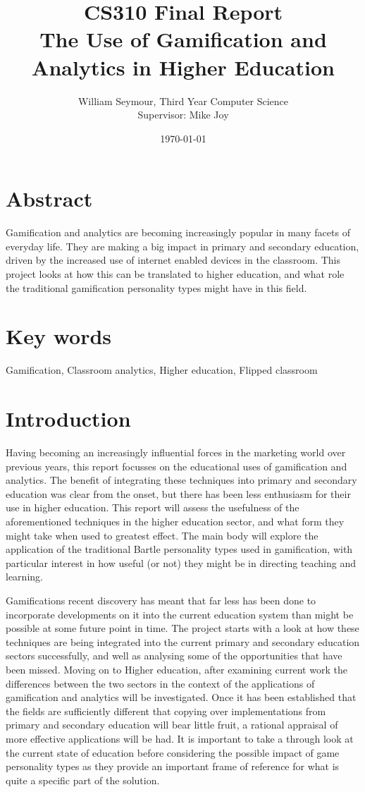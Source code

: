 \documentclass{article}
\title{CS310 Final Report \\ The Use of Gamification and Analytics in Higher Education}
\author{William Seymour, Third Year Computer Science \\ Supervisor: Mike Joy}
\date{\today}
\begin{document}
\maketitle
\clearpage
\tableofcontents
\listoffigures
\listoftables

\section{Abstract}
Gamification and analytics are becoming increasingly popular in many facets of everyday life. They are making a big impact in primary and secondary education, driven by the increased use of internet enabled devices in the classroom. This project looks at how this can be translated to higher education, and what role the traditional gamification personality types might have in this field.

\section{Key words}
Gamification, Classroom analytics, Higher education, Flipped classroom

\section{Introduction}
Having becoming an increasingly influential forces in the marketing world over previous years, this report focusses on the educational uses of gamification and analytics. The benefit of integrating these techniques into primary and secondary education was clear from the onset, but there has been less enthusiasm for their use in higher education. This report will assess the usefulness of the aforementioned techniques in the higher education sector, and what form they might take when used to greatest effect. The main body will explore the application of the traditional Bartle personality types used in gamification, with particular interest in how useful (or not) they might be in directing teaching and learning.

Gamifications recent discovery has meant that far less has been done to incorporate developments on it into the current education system than might be possible at some future point in time. The project starts with a look at how these techniques are being integrated into the current primary and secondary education sectors successfully, and well as analysing some of the opportunities that have been missed. Moving on to Higher education, after examining current work the differences between the two sectors in the context of the applications of gamification and analytics will be investigated. Once it has been established that the fields are sufficiently different that copying over implementations from primary and secondary education will bear little fruit, a rational appraisal of more effective applications will be had. It is important to take a through look at the current state of education before considering the possible impact of game personality types as they provide an important frame of reference for what is quite a specific part of the solution.
\end{document}
